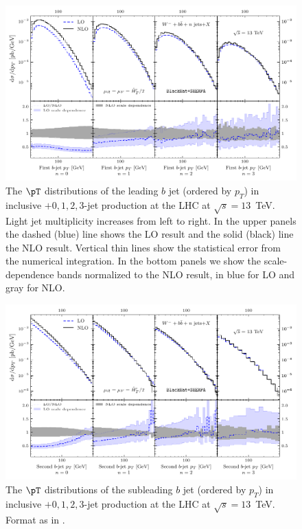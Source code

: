 \begin{figure}[t]
\centering
\includegraphics[clip,scale=1]{plots/ptleading}
  \caption{The $\pT$ distributions of the leading $b$ jet (ordered by $p_T$) in inclusive \Wbbm$+0,1,2,3$-jet
    production at the LHC at $\sqrt{s}=13$~TeV. Light
    jet multiplicity increases from left to right. In the upper panels the
    dashed (blue) line shows the LO result and the solid (black) line the NLO
    result. Vertical thin lines show the statistical error from the numerical
    integration. In the bottom panels we show the scale-dependence bands
    normalized to the NLO result, in blue for LO and gray for NLO.}
  \label{fig_Wmnjpt}
\end{figure}

\begin{figure}[t]
\centering
\includegraphics[clip,scale=1]{plots/ptsubleading}
  \caption{The $\pT$ distributions of the subleading $b$ jet (ordered by $p_T$) in inclusive \Wbbm$+0,1,2,3$-jet
    production at the LHC at $\sqrt{s}=13$~TeV. Format as in .}
  \label{fig_Wmnjpt2}
\end{figure}



